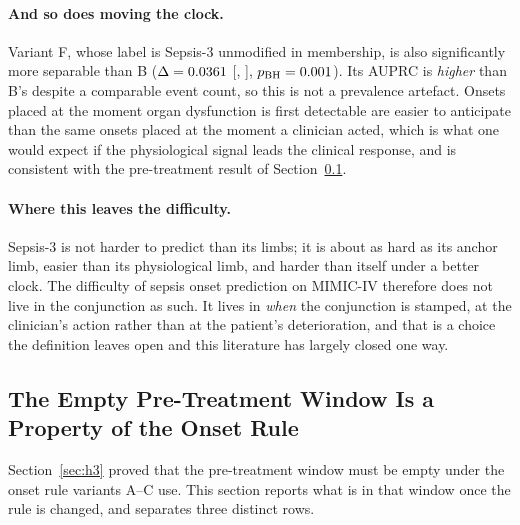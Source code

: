 \paragraph{And so does moving the clock.}
Variant F, whose label is Sepsis-3 unmodified in membership, is also
significantly more separable than B ($\Delta = 0.0361$
[\pcAltDeltaCiLoPrimaryF, \pcAltDeltaCiHiPrimaryF],
$p_{\text{BH}} = 0.001$). Its AUPRC is \emph{higher} than B's
despite a comparable event count, so this is not a prevalence artefact. Onsets
placed at the moment organ dysfunction is first detectable are easier to
anticipate than the same onsets placed at the moment a clinician acted, which
is what one would expect if the physiological signal leads the clinical
response, and is consistent with the pre-treatment result of
Section~\ref{sec:pretreatment_label}.

\paragraph{Where this leaves the difficulty.}
Sepsis-3 is not harder to predict than its limbs; it is about as hard as its
anchor limb, easier than its physiological limb, and harder than itself under a
better clock. The difficulty of sepsis onset prediction on MIMIC-IV therefore
does not live in the conjunction as such. It lives in \emph{when} the
conjunction is stamped, at the clinician's action rather than at the
patient's deterioration, and that is a choice the definition leaves open and
this literature has largely closed one way.

\subsection{The Empty Pre-Treatment Window Is a Property of the Onset Rule}
\label{sec:pretreatment_label}

Section~\ref{sec:h3} proved that the pre-treatment window must be empty under
the onset rule variants A--C use. This section reports what is in that window
once the rule is changed, and separates three distinct rows.

